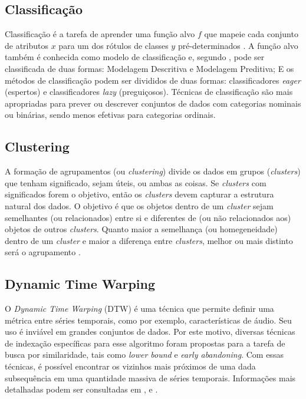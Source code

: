 \subsection{Classificação} \label{subsec:classificacao}
Classificação é a tarefa de aprender uma função alvo \textbf{\({f}\)} que mapeie cada conjunto de atributos \textbf{\({x}\)} para um dos rótulos de classes \textbf{\({y}\)} pré-determinados \cite{pang2009}. A função alvo também é conhecida como modelo de classificação e, segundo \cite{pang2009}, pode ser classificada de duas formas: Modelagem Descritiva e Modelagem Preditiva; E os métodos de classificação podem ser divididos de duas formas: classificadores \textit{eager} (espertos) e classificadores \textit{lazy} (preguiçosos). Técnicas de classificação são mais apropriadas para prever ou descrever conjuntos de dados com categorias nominais ou binárias, sendo menos efetivas para categorias ordinais.

\subsection{Clustering}\label{subsec:clustering}
A formação de agrupamentos (ou \textit{clustering}) divide os dados em grupos (\textit{clusters}) que tenham significado, sejam úteis, ou ambas as coisas. Se \textit{clusters} com significados forem o objetivo, então os \textit{clusters} devem capturar a estrutura natural dos dados. O objetivo é que os objetos dentro de um \textit{cluster} sejam semelhantes (ou relacionados) entre si e diferentes de (ou não relacionados aos) objetos de outros \textit{clusters}. Quanto maior a semelhança (ou homegeneidade) dentro de um \textit{cluster} e maior a diferença entre \textit{clusters}, melhor ou mais distinto será o agrupamento \cite{pang2009}.

\subsection{Dynamic Time Warping} \label{subsec:dtw}
O \textit{Dynamic Time Warping} (DTW) \cite{keogh2004} é uma técnica que permite definir uma métrica entre séries temporais, como por exemplo, características de áudio. Seu uso é inviável em grandes conjuntos de dados. Por este motivo, diversas técnicas de indexação específicas para esse algoritmo foram propostas para a tarefa de busca por similaridade, tais como \textit{lower bound} e \textit{early abandoning}. Com essas técnicas, é possível encontrar os vizinhos mais próximos de uma dada subsequência em uma quantidade massiva de séries temporais. Informações mais detalhadas podem ser consultadas em \cite{mizutani2006}, \cite{kruskal1983} e \cite{juang1991}.

